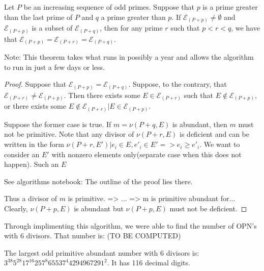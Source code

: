 \documentclass[../paper.tex]{subfiles}
\begin{document}
\begin{theorem} 
Let $P$ be an increasing sequence of odd primes. Suppose
that $p$ is a prime greater than the last prime of $P$ and $q$ a
prime greater than $p$. If $\mathcal{E}_{(P + p)} \neq 
\emptyset$ and $\mathcal{E}_{(P + p)}$ is a subset of 
$\mathcal{E}_{(P + q)}$, then for any prime $r$ such that $p <
r < q$, we have that $\mathcal{E}_{(P + p)} = \mathcal{E}_{(P +
r)} = \mathcal{E}_{(P + q)}$.
\end{theorem}

Note: This theorem takes what runs in possibly a year and allows
the algorithm to run in just a few days or less.

\begin{proof}
Suppose that $\mathcal{E}_{(P + p)} = \mathcal{E}_{(P + q)}$.
Suppose, to the contrary, that $\mathcal{E}_{(P+r)} \neq
\mathcal{E}_{(P + p)}$. Then there exists some $E \in
\mathcal{E}_{(P + r)}$ such that $E \notin \mathcal{E}_{(P + p)}$, or there
exists some $E \notin \mathcal{E}_{(P + r)} | E \in \mathcal{E}_{(P +
p)}$. 

Suppose the former case is true. If $m = \nu(P + q, E)$ is abundant,
then $m$ must not be primitive. Note that any divisor of $\nu(P +
r, E)$ is deficient and can be written in the form $\nu(P + r, E')
| e_i \in E, e'_i \in E' => e_i \geq e'_i$. We want to consider
an $E'$ with nonzero elements only(separate case when this does
not happen). Such an $E$ 

See algorithms notebook: The outline of the proof lies there.

Thus a divisor of $m$ is
primitive. => ... => m is primitive abundant for...
Clearly, $\nu(P + p, E)$ is
abundant but $\nu(P + p, E)$ must not be deficient. 

\end{proof}

Through implimenting this algorithm, we were able to find the
number of OPN's with 6 divisors. That number is: (TO BE COMPUTED)


The largest odd primitive abundant number with 6 divisors is:
$3^{38} 5^{28} 17^{16} 257^8 65537^4 4294967291^2$. It has 116 decimal
digits.
\end{document}

